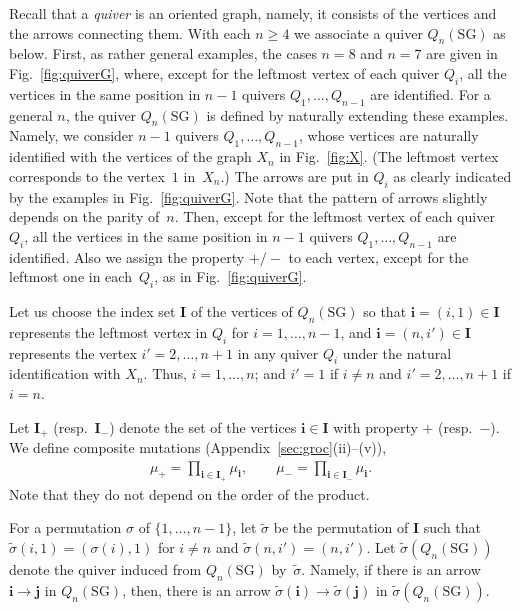 \documentclass[pdftex]{sigma}
\numberwithin{equation}{section}
\theoremstyle{definition}
\begin{document}
Recall that a {\em quiver\/} is an oriented graph,
namely, it consists of the vertices and the arrows
connecting them.
With each $n \geq 4$ we associate
 a quiver $Q_{n}(\mathrm{SG})$ as below.
First, as rather general examples, the cases $n=8$ and $n=7$ are given in
 Fig.~\ref{fig:quiverG},
where, except for the leftmost vertex of each quiver $Q_i$,
 all the  vertices in the same position
 in  $n-1$ quivers $Q_1,\dots,Q_{n-1}$ are
identif\/ied.
For a general $n$,  the quiver $Q_{n}(\mathrm{SG})$ is def\/ined
by naturally extending these examples.
Namely, we consider $n-1$ quivers $Q_1,\dots, Q_{n-1}$,
whose vertices are naturally identif\/ied with
the vertices of the graph $X_n$ in Fig.~\ref{fig:X}.
(The leftmost vertex corresponds to the vertex~$1$ in~$X_n$.)
The arrows are put in $Q_i$ as clearly indicated by the examples
in Fig.~\ref{fig:quiverG}.
Note that the pattern of arrows slightly
depends on the parity of~$n$.
Then, except for the leftmost vertex of each quiver~$Q_i$,
 all the  vertices in the same position
 in  $n-1$ quivers $Q_1,\dots,Q_{n-1}$ are
identif\/ied.
Also we assign the property $+/-$
to  each vertex, except for the leftmost one in each~$Q_i$,
 as in Fig.~\ref{fig:quiverG}.

Let us choose  the index set $\mathbf{I}$
of the vertices of $Q_{n}(\mathrm{SG})$
so that $\mathbf{i}=(i,1)\in \mathbf{I}$ represents
the leftmost vertex in $Q_i$ for $i=1,\dots,n-1$,
 and $\mathbf{i}=(n,i')\in \mathbf{I}$ represents
the vertex $i'=2,\dots,n+1$ in any quiver $Q_i$
under the natural
identif\/ication with $X_n$.
Thus, $i=1,\dots,n$; and $i'=1$ if $i\neq n$
and $i'=2,\dots,n+1$ if $i=n$.

Let $\mathbf{I}_+$
(resp.\ $\mathbf{I}_-$)
denote the set of the vertices $\mathbf{i}\in \mathbf{I}$ with
property  $+$ (resp.\  $-$).
We def\/ine composite mutations (Appendix~\ref{sec:groc}(ii)--(v)),
\begin{gather*}
\mu_+=\prod_{\mathbf{i}\in\mathbf{I}_+}
\mu_{\mathbf{i}},
\qquad
\mu_-=\prod_{\mathbf{i}\in\mathbf{I}_-}
\mu_{\mathbf{i}}.
\end{gather*}
Note that they do not depend on the order of the product.

For a permutation $\sigma$ of $\{1,\dots,n-1 \}$,
let $\tilde{\sigma}$ be the permutation of
$\mathbf{I}$ such that
$\tilde{\sigma}(i,1)=(\sigma(i),1)$ for $i\neq n$
and $\tilde{\sigma}(n,i')=(n,i')$.
Let $\tilde{\sigma}(Q_{n}(\mathrm{SG}))$
denote the
quiver induced from $Q_{n}(\mathrm{SG})$
 by~$\tilde{\sigma}$.
Namely, if there is an arrow
 $\mathbf{i}\rightarrow
\mathbf{j}$ in $Q_{n}(\mathrm{SG})$,
then, there is an arrow
$\tilde{\sigma}(\mathbf{i})
\rightarrow
\tilde{\sigma}(\mathbf{j})
$
in  $\tilde{\sigma}(Q_{n}(\mathrm{SG}))$.
\end{document}
